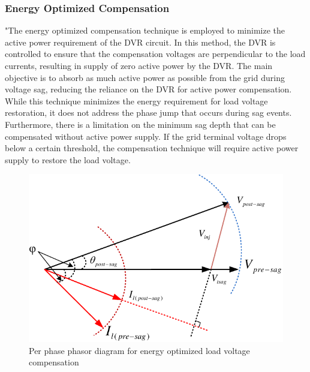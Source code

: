 \vspace{-1em}
\subsubsection{Energy Optimized Compensation}
\vspace{-1em}
"The energy optimized compensation technique is employed to minimize the active power requirement of the DVR circuit. In this method, the DVR is controlled to ensure that the compensation voltages are perpendicular to the load currents, resulting in supply of zero active power by the DVR. The main objective is to absorb as much active power as possible from the grid during voltage sag, reducing the reliance on the DVR for active power compensation. While this technique minimizes the energy requirement for load voltage restoration, it does not address the phase jump that occurs during sag events. Furthermore, there is a limitation on the minimum sag depth that can be compensated without active power supply. If the grid terminal voltage drops below a certain threshold, the compensation technique will require active power supply to restore the load voltage.
\vspace*{-0.5cm}
\begin{figure}[h!]
	\centering
    \includegraphics[scale=0.9]{figures/Chapter_1_2/c2_energy_optimize}
    \caption{Per phase phasor diagram for energy optimized load voltage compensation}
    \label{2.energy_optimized}
\end{figure} \vspace*{-0.5cm}

